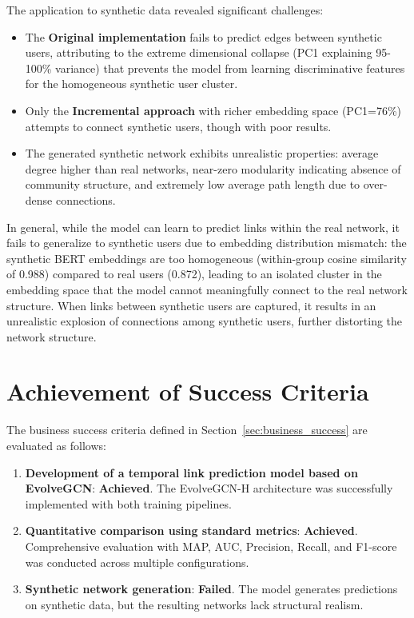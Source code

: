 The application to synthetic data revealed significant challenges:

\begin{itemize}
	\item The \textcolor{drawred}{\textbf{Original implementation}} fails to predict edges between synthetic users, attributing to the extreme dimensional collapse (PC1 explaining 95-100\% variance) that prevents the model from learning discriminative features for the homogeneous synthetic user cluster.
	\item Only the \textcolor{drawblue}{\textbf{Incremental approach}} with richer embedding space (PC1=76\%) attempts to connect synthetic users, though with poor results.
	\item The generated synthetic network exhibits unrealistic properties: average degree higher than real networks, near-zero modularity indicating absence of community structure, and extremely low average path length due to over-dense connections.
\end{itemize}

In general, while the model can learn to predict links within the real network, it fails to generalize to synthetic users due to embedding distribution mismatch: the synthetic BERT embeddings are too homogeneous (within-group cosine similarity of 0.988) compared to real users (0.872), leading to an isolated cluster in the embedding space that the model cannot meaningfully connect to the real network structure. When links between synthetic users are captured, it results in an unrealistic explosion of connections among synthetic users, further distorting the network structure.

\section{Achievement of Success Criteria}

The business success criteria defined in Section~\ref{sec:business_success} are evaluated as follows:

\begin{enumerate}
	\item \textbf{Development of a temporal link prediction model based on EvolveGCN}: \textcolor{drawgreen}{\textbf{Achieved}}. The EvolveGCN-H architecture was successfully implemented with both training pipelines.

	\item \textbf{Quantitative comparison using standard metrics}: \textcolor{drawgreen}{\textbf{Achieved}}. Comprehensive evaluation with MAP, AUC, Precision, Recall, and F1-score was conducted across multiple configurations.

	\item \textbf{Synthetic network generation}: \textcolor{drawred}{\textbf{Failed}}. The model generates predictions on synthetic data, but the resulting networks lack structural realism.
\end{enumerate}

